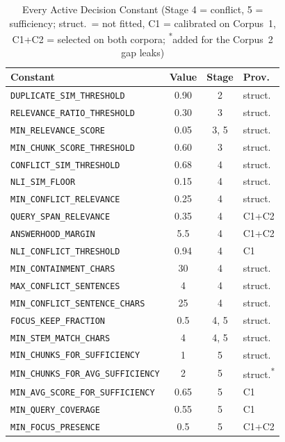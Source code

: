 \documentclass[conference]{IEEEtran}
\begin{document}
\begin{table}[htbp]
\caption{Every Active Decision Constant (Stage 4 = conflict, 5 =
sufficiency; struct.\ = not fitted, C1 = calibrated on Corpus~1, C1+C2 =
selected on both corpora; \textsuperscript{*}added for the Corpus~2 gap
leaks)}
\label{tab:constants_full}
\centering
\scriptsize
\setlength{\tabcolsep}{3pt}
\begin{tabularx}{\columnwidth}{@{}X c c l@{}}
\toprule
Constant & Value & Stage & Prov. \\
\midrule
\texttt{DUPLICATE\_SIM\_THRESHOLD}        & 0.90 & 2    & struct. \\
\texttt{RELEVANCE\_RATIO\_THRESHOLD}      & 0.30 & 3    & struct. \\
\texttt{MIN\_RELEVANCE\_SCORE}            & 0.05 & 3, 5 & struct. \\
\texttt{MIN\_CHUNK\_SCORE\_THRESHOLD}     & 0.60 & 3    & struct. \\
\texttt{CONFLICT\_SIM\_THRESHOLD}         & 0.68 & 4    & struct. \\
\texttt{NLI\_SIM\_FLOOR}                  & 0.15 & 4    & struct. \\
\texttt{MIN\_CONFLICT\_RELEVANCE}         & 0.25 & 4    & struct. \\
\texttt{QUERY\_SPAN\_RELEVANCE}           & 0.35 & 4    & C1+C2 \\
\texttt{ANSWERHOOD\_MARGIN}               & 5.5  & 4    & C1+C2 \\
\texttt{NLI\_CONFLICT\_THRESHOLD}         & 0.94 & 4    & C1 \\
\texttt{MIN\_CONTAINMENT\_CHARS}          & 30   & 4    & struct. \\
\texttt{MAX\_CONFLICT\_SENTENCES}         & 4    & 4    & struct. \\
\texttt{MIN\_CONFLICT\_SENTENCE\_CHARS}   & 25   & 4    & struct. \\
\texttt{FOCUS\_KEEP\_FRACTION}            & 0.5  & 4, 5 & struct. \\
\texttt{MIN\_STEM\_MATCH\_CHARS}          & 4    & 4, 5 & struct. \\
\texttt{MIN\_CHUNKS\_FOR\_SUFFICIENCY}    & 1    & 5    & struct. \\
\texttt{MIN\_CHUNKS\_FOR\_AVG\_SUFFICIENCY} & 2  & 5    & struct.\textsuperscript{*} \\
\texttt{MIN\_AVG\_SCORE\_FOR\_SUFFICIENCY} & 0.65 & 5   & C1 \\
\texttt{MIN\_QUERY\_COVERAGE}             & 0.55 & 5    & C1 \\
\texttt{MIN\_FOCUS\_PRESENCE}             & 0.5  & 5    & C1+C2 \\
\bottomrule
\end{tabularx}
\end{table}
\end{document}
